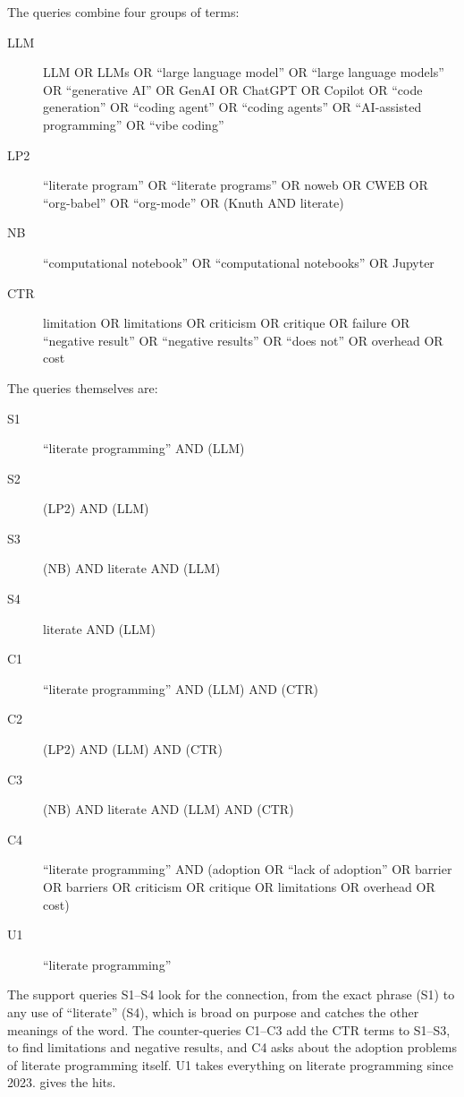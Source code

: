 The queries combine four groups of terms:
\begin{description}
  \item[LLM] LLM OR LLMs OR \enquote{large language model} OR \enquote{large
    language models} OR \enquote{generative AI} OR GenAI OR ChatGPT OR Copilot
    OR \enquote{code generation} OR \enquote{coding agent} OR \enquote{coding
    agents} OR \enquote{AI-assisted programming} OR \enquote{vibe coding}
  \item[LP2] \enquote{literate program} OR \enquote{literate programs} OR noweb
    OR CWEB OR \enquote{org-babel} OR \enquote{org-mode} OR (Knuth AND
    literate)
  \item[NB] \enquote{computational notebook} OR \enquote{computational
    notebooks} OR Jupyter
  \item[CTR] limitation OR limitations OR criticism OR critique OR failure OR
    \enquote{negative result} OR \enquote{negative results} OR \enquote{does
    not} OR overhead OR cost
\end{description}
The queries themselves are:
\begin{description}
  \item[S1] \enquote{literate programming} AND (LLM)
  \item[S2] (LP2) AND (LLM)
  \item[S3] (NB) AND literate AND (LLM)
  \item[S4] literate AND (LLM)
  \item[C1] \enquote{literate programming} AND (LLM) AND (CTR)
  \item[C2] (LP2) AND (LLM) AND (CTR)
  \item[C3] (NB) AND literate AND (LLM) AND (CTR)
  \item[C4] \enquote{literate programming} AND (adoption OR \enquote{lack of
    adoption} OR barrier OR barriers OR criticism OR critique OR limitations OR
    overhead OR cost)
  \item[U1] \enquote{literate programming}
\end{description}
The support queries S1--S4 look for the connection, from the exact phrase (S1)
to any use of \enquote{literate} (S4), which is broad on purpose and catches
the other meanings of the word.
The counter-queries C1--C3 add the CTR terms to S1--S3, to find limitations and
negative results, and C4 asks about the adoption problems of literate
programming itself.
U1 takes everything on literate programming since 2023.
 gives the hits.

